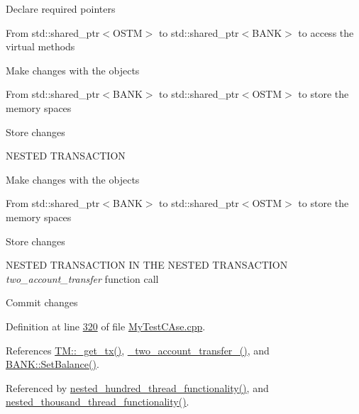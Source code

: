 Declare required pointers

From std\+::shared\+\_\+ptr$<$\+O\+S\+T\+M$>$ to std\+::shared\+\_\+ptr$<$\+B\+A\+N\+K$>$ to access the virtual methods

Make changes with the objects

From std\+::shared\+\_\+ptr$<$\+B\+A\+N\+K$>$ to std\+::shared\+\_\+ptr$<$\+O\+S\+T\+M$>$ to store the memory spaces

Store changes

N\+E\+S\+T\+ED T\+R\+A\+N\+S\+A\+C\+T\+I\+ON

Make changes with the objects

From std\+::shared\+\_\+ptr$<$\+B\+A\+N\+K$>$ to std\+::shared\+\_\+ptr$<$\+O\+S\+T\+M$>$ to store the memory spaces

Store changes

N\+E\+S\+T\+ED T\+R\+A\+N\+S\+A\+C\+T\+I\+ON IN T\+HE N\+E\+S\+T\+ED T\+R\+A\+N\+S\+A\+C\+T\+I\+ON {\itshape two\+\_\+account\+\_\+transfer} function call

Commit changes

Definition at line \hyperlink{_my_test_c_ase_8cpp_source_l00320}{320} of file \hyperlink{_my_test_c_ase_8cpp_source}{My\+Test\+C\+Ase.\+cpp}.



References \hyperlink{_t_m_8cpp_source_l00079}{T\+M\+::\+\_\+get\+\_\+tx()}, \hyperlink{_my_test_c_ase_8cpp_source_l00266}{\+\_\+two\+\_\+account\+\_\+transfer\+\_\+()}, and \hyperlink{_b_a_n_k_8h_source_l00046}{B\+A\+N\+K\+::\+Set\+Balance()}.



Referenced by \hyperlink{_my_test_c_ase_8cpp_source_l00680}{nested\+\_\+hundred\+\_\+thread\+\_\+functionality()}, and \hyperlink{_my_test_c_ase_8cpp_source_l00715}{nested\+\_\+thousand\+\_\+thread\+\_\+functionality()}.


